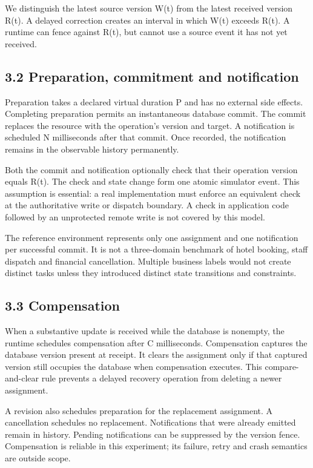 \documentclass[10pt]{article}
\begin{document}
We distinguish the latest source version W(t) from the latest received version R(t). A delayed correction creates an interval in which W(t) exceeds R(t). A runtime can fence against R(t), but cannot use a source event it has not yet received.


\subsection*{3.2 Preparation, commitment and notification}

Preparation takes a declared virtual duration P and has no external side effects. Completing preparation permits an instantaneous database commit. The commit replaces the resource with the operation's version and target. A notification is scheduled N milliseconds after that commit. Once recorded, the notification remains in the observable history permanently.


Both the commit and notification optionally check that their operation version equals R(t). The check and state change form one atomic simulator event. This assumption is essential: a real implementation must enforce an equivalent check at the authoritative write or dispatch boundary. A check in application code followed by an unprotected remote write is not covered by this model.


The reference environment represents only one assignment and one notification per successful commit. It is not a three-domain benchmark of hotel booking, staff dispatch and financial cancellation. Multiple business labels would not create distinct tasks unless they introduced distinct state transitions and constraints.


\subsection*{3.3 Compensation}

When a substantive update is received while the database is nonempty, the runtime schedules compensation after C milliseconds. Compensation captures the database version present at receipt. It clears the assignment only if that captured version still occupies the database when compensation executes. This compare-and-clear rule prevents a delayed recovery operation from deleting a newer assignment.


A revision also schedules preparation for the replacement assignment. A cancellation schedules no replacement. Notifications that were already emitted remain in history. Pending notifications can be suppressed by the version fence. Compensation is reliable in this experiment; its failure, retry and crash semantics are outside scope.
\end{document}
